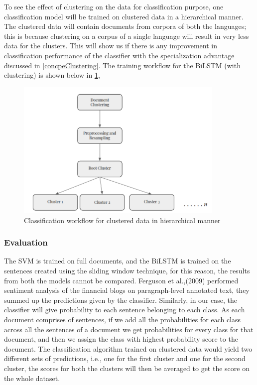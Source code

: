 To see the effect of clustering on the data for classification purpose, one classification model will be trained on clustered data in a hierarchical manner. The clustered data will contain documents from corpora of both the languages; this is because clustering on a corpus of a single language will result in very less data for the clusters. This will show us if there is any improvement in classification performance of the classifier with the specialization advantage discussed in \ref{concpeClustering}. The training workflow for the \gls{BiLSTM} (with clustering) is shown below in \ref{fig:clusterFlowClassification}, 
\clearpage
\begin{figure}[!ht]
    \centering
    \includegraphics[width=10cm,keepaspectratio]{pics/approach_cls.png}
    \captionsetup{justification=centering,margin=1cm}
    \caption{Classification workflow for clustered data in hierarchical manner}
    \label{fig:clusterFlowClassification}
\end{figure}

\subsubsection*{Evaluation} \label{evaluationQuestionOne}
The \gls{SVM} is trained on full documents, and the \gls{BiLSTM} is trained on the sentences created using the sliding window technique, for this reason, the results from both the models cannot be compared. Ferguson et al.,(2009) \cite{ferguson2009exploring} performed sentiment analysis of the financial blogs on paragraph-level 
annotated text, they summed up the predictions given by the classifier. Similarly, in our case, the classifier will give probability to each sentence belonging to each class. As each document comprises of sentences, if we add all the probabilities for each class across all the sentences of a document we get probabilities for every class for that document, and then we assign the class with highest probability score to the document. The classification algorithm trained on clustered data would yield two different sets of predictions, i.e., one for the first cluster and one for the second cluster, the scores for both the clusters will then be averaged to get the score on the whole dataset.

